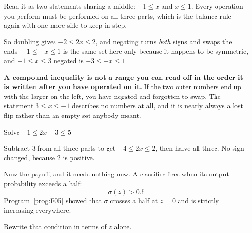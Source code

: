 \begin{fr}
Read it as two statements sharing a middle: $-1 \le x$ and $x \le 1$. Every
operation you perform must be performed on all three parts, which is the
balance rule again with one more side to keep in step.

So doubling gives $-2 \le 2x \le 2$, and negating turns \emph{both} signs and
swaps the ends: $-1 \le -x \le 1$ is the same set here only because it happens
to be symmetric, and $-1 \le x \le 3$ negated is $-3 \le -x \le 1$.

\begin{warning}
\textbf{A compound inequality is not a range you can read off in the order it
is written after you have operated on it.} If the two outer numbers end up
with the larger on the left, you have negated and forgotten to swap. The
statement $3 \le x \le -1$ describes no numbers at all, and it is nearly
always a lost flip rather than an empty set anybody meant.
\end{warning}

Solve $-1 \le 2x + 3 \le 5$.
\nextframe
\end{fr}

\begin{fr}
Subtract $3$ from all three parts to get $-4 \le 2x \le 2$, then halve all
three. No sign changed, because $2$ is positive.

Now the payoff, and it needs nothing new. A classifier fires when its output
probability exceeds a half:
\[ \sigma(z) > \num{0.5} \]
Program~\ref{prog:F05} showed that $\sigma$ crosses a half at $z = 0$ and is
strictly increasing everywhere.

Rewrite that condition in terms of $z$ alone.
\nextframe
\end{fr}

